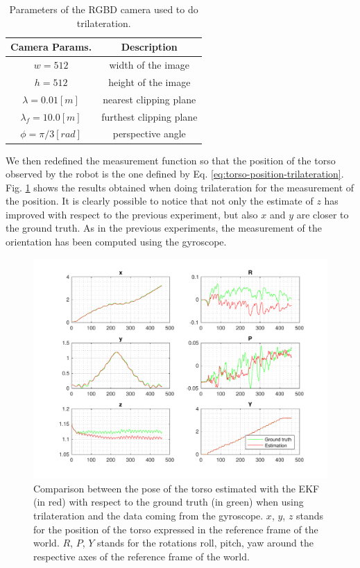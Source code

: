 \documentclass[a4paper]{article}
\begin{document}
\begin{table}
	\centering
	\begin{tabular}{*{2}{c}}
		Camera Params. & Description \\
		\hline
		$w=512$ & width of the image \\
        $h=512$ & height of the image \\
        $\lambda=0.01 [m]$ & nearest clipping plane \\
        $\lambda_f=10.0 [m]$ & furthest clipping plane \\
        $\phi=\pi/3 [rad]$ & perspective angle \\
	\end{tabular}
	\caption{Parameters of the RGBD camera used to do trilateration.}
	\label{table:trilateration-rgbd-params}
\end{table}

We then redefined
the measurement function so that the position of the torso observed by the
robot is the one defined by Eq. \ref{eq:torso-position-trilateration}.
Fig. \ref{fig:comp-ground-truth-estimated-torso} shows the results obtained
when doing trilateration for the measurement of the position. It is
clearly possible to notice that not only the estimate of $z$ has improved with
respect to the previous experiment, but also $x$ and $y$ are closer to the
ground truth. As in the
previous experiments, the measurement of
the orientation has been computed using the gyroscope.

\begin{figure}
    \centering
    \includegraphics[width=\textwidth]{images/trilateration}
    \caption{Comparison between the pose of the torso estimated
        with the EKF (in red) with respect to the ground
        truth (in green) when using trilateration and the data coming
        from the gyroscope. $x$, $y$, $z$ stands for the position
        of the torso expressed in the reference frame of the
        world. $R$, $P$, $Y$ stands for the rotations roll,
        pitch, yaw around the respective axes of the
        reference frame of the world.}
    \label{fig:comp-ground-truth-estimated-torso}
\end{figure}
\end{document}
